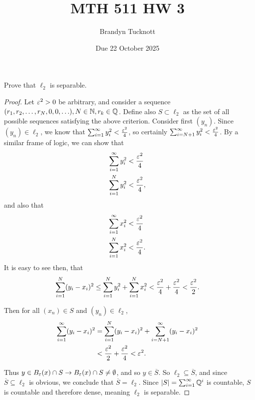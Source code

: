 \documentclass{exam}
\title{MTH 511 HW 3}
\author{Brandyn Tucknott}
\date{Due 22 October 2025}
\begin{document}
\maketitle

\begin{questions}
    \question Prove that $\ell_2$ is separable.
    \begin{proof}
        Let $\varepsilon^2 > 0$ be arbitrary, and consider a sequence $(r_1, r_2, \hdots, r_N, 0, 0, \hdots), N\in\mathbb {N}, r_k\in\mathbb {Q}$. 
        Define also $S\subset\ell_2$ as the set of all possible sequences satisfying the above criterion. Consider first $(y_n)$.
        Since $(y_n)\in\ell_2$, we know that $\sum_{i = 1}^\infty y_i^2 < \frac{\varepsilon^2}{4}$, so certainly 
        $\sum_{i = N + 1}^\infty y_i^2 < \frac{\varepsilon^2}{4}$. By a similar frame of logic, we can show that
        \begin{align*}
            \sum_{i = 1}^\infty y_i^2 &< \frac{\varepsilon^2}{4} \\
            \sum_{i = 1}^N y_i^2 &< \frac{\varepsilon^2}{4},
        \end{align*}
        and also that
        \begin{align*}
            \sum_{i = 1}^\infty x_i^2 &< \frac{\varepsilon^2}{4} \\
            \sum_{i = 1}^N x_i^2 &< \frac{\varepsilon^2}{4}.
        \end{align*}
        It is easy to see then, that 
        $$\sum_{i = 1}^N (y_i - x_i)^2 \leq \sum_{i = 1}^N y_i^2 + \sum_{i = 1}^N x_i^2 < \frac{\varepsilon^2}{4} + \frac{\varepsilon^2}{4} < \frac{\varepsilon^2}{2}.$$
        
        Then for all $(x_n)\in S$
        and $(y_n)\in \ell_2$,
        \begin{align*}
            \sum_{i = 1}^\infty (y_i - x_i)^2 &= \sum_{i = 1}^N (y_i - x_i)^2 + \sum_{i = N + 1}^\infty (y_i - x_i)^2 \\
            &< \frac{\varepsilon^2}{2} + \frac{\varepsilon^2}{4} < \varepsilon^2.
        \end{align*}

        Thus $y\in B_\varepsilon(x)\cap S \rightarrow B_\varepsilon (x)\cap S \neq \emptyset$, and so $y\in \overline{S}$. So $\ell_2 \subseteq\overline{S}$, 
        and since $\overline{S} \subseteq \ell_2$ is obvious, we conclude that $\overline{S} = \ell_2$. Since $|S| = \sum_{i = 1}^\infty \mathbb {Q}^i$ is countable,
        $S$ is countable and therefore dense, meaning $\ell_2$ is separable.
    \end{proof}



\end{questions}
\end{document}
